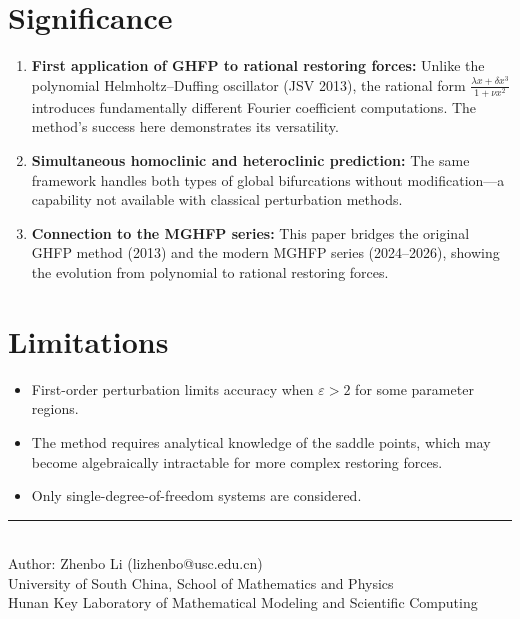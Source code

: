 \documentclass[11pt,a4paper]{article}
\begin{document}
\section{Significance}

\begin{enumerate}[leftmargin=2em]
\item \textbf{First application of GHFP to rational restoring forces:} Unlike the polynomial Helmholtz--Duffing oscillator (JSV 2013), the rational form $\frac{\lambda x + \delta x^3}{1+\nu x^2}$ introduces fundamentally different Fourier coefficient computations. The method's success here demonstrates its versatility.

\item \textbf{Simultaneous homoclinic and heteroclinic prediction:} The same framework handles both types of global bifurcations without modification---a capability not available with classical perturbation methods.

\item \textbf{Connection to the MGHFP series:} This paper bridges the original GHFP method (2013) and the modern MGHFP series (2024--2026), showing the evolution from polynomial to rational restoring forces.
\end{enumerate}

\section{Limitations}

\begin{itemize}[leftmargin=2em]
\item First-order perturbation limits accuracy when $\varepsilon > 2$ for some parameter regions.
\item The method requires analytical knowledge of the saddle points, which may become algebraically intractable for more complex restoring forces.
\item Only single-degree-of-freedom systems are considered.
\end{itemize}

\vfill
\begin{center}
\small\rule{0.5\textwidth}{0.3pt}\\[4pt]
\small\color{primary} Author: Zhenbo Li (lizhenbo@usc.edu.cn)\\
\small University of South China, School of Mathematics and Physics\\
\small Hunan Key Laboratory of Mathematical Modeling and Scientific Computing
\end{center}
\end{document}
